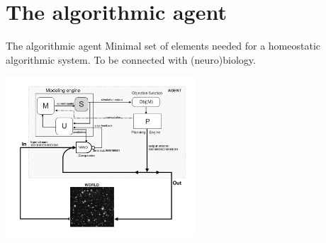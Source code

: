 \section{The algorithmic agent}

\begin{frame}[label=ladila]{The algorithmic agent}
Minimal set of elements needed for a homeostatic algorithmic system. To be connected with (neuro)biology.
 \begin{center}
  \includegraphics[height=6cm]{img/agent.png}
  \end{center}

\end{frame}



